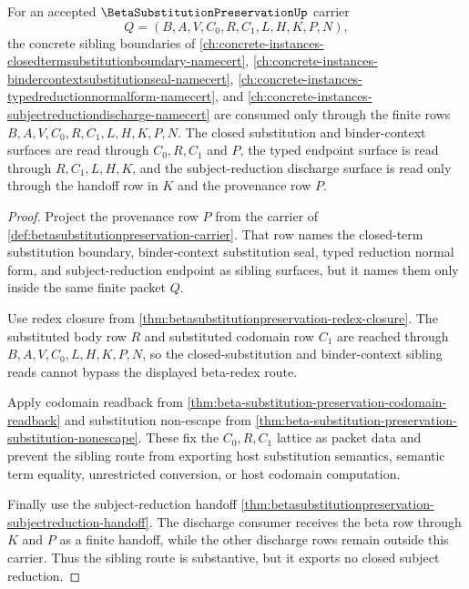 \begin{theorem}
\label{thm:betasubstitutionpreservation-sibling-boundary-lattice}
For an accepted $\BetaSubstitutionPreservationUp$ carrier
$$
Q=(B,A,V,C_0,R,C_1,L,H,K,P,N),
$$
the concrete sibling boundaries of \autoref{ch:concrete-instances-closedtermsubstitutionboundary-namecert}, \autoref{ch:concrete-instances-bindercontextsubstitutionseal-namecert}, \autoref{ch:concrete-instances-typedreductionnormalform-namecert}, and \autoref{ch:concrete-instances-subjectreductiondischarge-namecert} are consumed only through the finite rows $B,A,V,C_0,R,C_1,L,H,K,P,N$. The closed substitution and binder-context surfaces are read through $C_0,R,C_1$ and $P$, the typed endpoint surface is read through $R,C_1,L,H,K$, and the subject-reduction discharge surface is read only through the handoff row in $K$ and the provenance row $P$.
\end{theorem}
\begin{proof}
Project the provenance row $P$ from the carrier of \autoref{def:betasubstitutionpreservation-carrier}. That row names the closed-term substitution boundary, binder-context substitution seal, typed reduction normal form, and subject-reduction endpoint as sibling surfaces, but it names them only inside the same finite packet $Q$.

Use redex closure from \autoref{thm:betasubstitutionpreservation-redex-closure}. The substituted body row $R$ and substituted codomain row $C_1$ are reached through $B,A,V,C_0,L,H,K,P,N$, so the closed-substitution and binder-context sibling reads cannot bypass the displayed beta-redex route.

Apply codomain readback from \autoref{thm:beta-substitution-preservation-codomain-readback} and substitution non-escape from \autoref{thm:beta-substitution-preservation-substitution-nonescape}. These fix the $C_0,R,C_1$ lattice as packet data and prevent the sibling route from exporting host substitution semantics, semantic term equality, unrestricted conversion, or host codomain computation.

Finally use the subject-reduction handoff \autoref{thm:betasubstitutionpreservation-subjectreduction-handoff}. The discharge consumer receives the beta row through $K$ and $P$ as a finite handoff, while the other discharge rows remain outside this carrier. Thus the sibling route is substantive, but it exports no closed subject reduction.
\end{proof}

